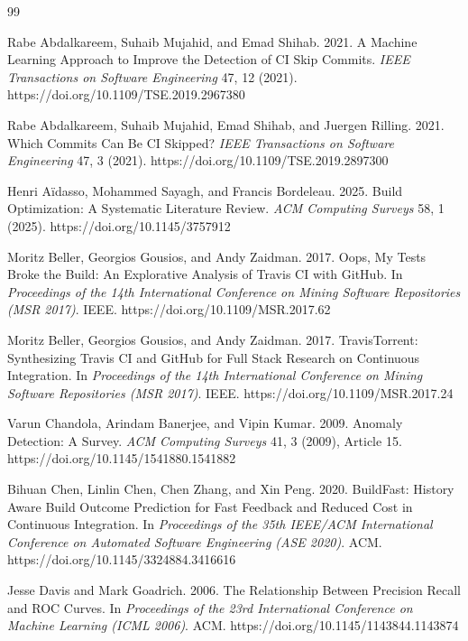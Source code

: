 \documentclass[sigconf,review,anonymous,nonacm]{acmart}
\begin{document}
\begin{thebibliography}{99}

Rabe Abdalkareem, Suhaib Mujahid, and Emad Shihab. 2021.
A Machine Learning Approach to Improve the Detection of CI Skip Commits.
\textit{IEEE Transactions on Software Engineering} 47, 12 (2021). https://doi.org/10.1109/TSE.2019.2967380

Rabe Abdalkareem, Suhaib Mujahid, Emad Shihab, and Juergen Rilling. 2021.
Which Commits Can Be CI Skipped?
\textit{IEEE Transactions on Software Engineering} 47, 3 (2021). https://doi.org/10.1109/TSE.2019.2897300

Henri A\"{i}dasso, Mohammed Sayagh, and Francis Bordeleau. 2025.
Build Optimization: A Systematic Literature Review.
\textit{ACM Computing Surveys} 58, 1 (2025). https://doi.org/10.1145/3757912

Moritz Beller, Georgios Gousios, and Andy Zaidman. 2017.
Oops, My Tests Broke the Build: An Explorative Analysis of Travis CI with GitHub.
In \textit{Proceedings of the 14th International Conference on Mining Software Repositories (MSR 2017)}. IEEE. https://doi.org/10.1109/MSR.2017.62

Moritz Beller, Georgios Gousios, and Andy Zaidman. 2017.
TravisTorrent: Synthesizing Travis CI and GitHub for Full Stack Research on Continuous Integration.
In \textit{Proceedings of the 14th International Conference on Mining Software Repositories (MSR 2017)}. IEEE. https://doi.org/10.1109/MSR.2017.24

Varun Chandola, Arindam Banerjee, and Vipin Kumar. 2009.
Anomaly Detection: A Survey.
\textit{ACM Computing Surveys} 41, 3 (2009), Article 15. https://doi.org/10.1145/1541880.1541882

Bihuan Chen, Linlin Chen, Chen Zhang, and Xin Peng. 2020.
BuildFast: History Aware Build Outcome Prediction for Fast Feedback and Reduced Cost in Continuous Integration.
In \textit{Proceedings of the 35th IEEE/ACM International Conference on Automated Software Engineering (ASE 2020)}. ACM. https://doi.org/10.1145/3324884.3416616

Jesse Davis and Mark Goadrich. 2006.
The Relationship Between Precision Recall and ROC Curves.
In \textit{Proceedings of the 23rd International Conference on Machine Learning (ICML 2006)}. ACM. https://doi.org/10.1145/1143844.1143874


\end{thebibliography}
\end{document}
